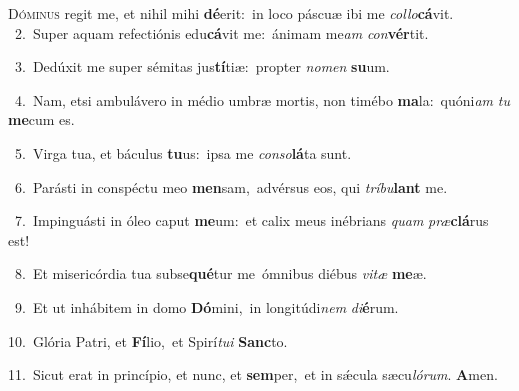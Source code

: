 \lettrine{\initial\textcolor{\initialcolor}{D}}{óminus} regit me, et nihil mihi \textbf{dé}\-erit:~\star in loco páscuæ ibi me \textit{col}\-\textit{lo}\textbf{cá}vit.\\
{\numbfont\textcolor{\numbcolor}{~2.}}~Super aquam refectiónis edu\-\textbf{cá}\-vit me:~\star ánimam me\textit{am} \textit{con}\-\textbf{vér}tit.\par
{\numbfont\textcolor{\numbcolor}{~3.}}~Dedúxit me super sémitas jus\-\textbf{tí}\-tiæ:~\star propter \textit{no}\-\textit{men} \textbf{su}\-um.\par
{\numbfont\textcolor{\numbcolor}{~4.}}~Nam, etsi ambulávero in médio umbræ mortis, non timébo \textbf{ma}\-la:~\star quóni\textit{am} \textit{tu} \textbf{me}\-cum es.\par
{\numbfont\textcolor{\numbcolor}{~5.}}~Virga tua, et báculus \textbf{tu}\-us:~\star ipsa me \textit{con}\-\textit{so}\textbf{lá}ta sunt.\par
{\numbfont\textcolor{\numbcolor}{~6.}}~Parásti in conspéctu meo \textbf{men}\-sam,~\star advérsus eos, qui \textit{trí}\-\textit{bu}\textbf{lant} me.\par
{\numbfont\textcolor{\numbcolor}{~7.}}~Impinguásti in óleo caput \textbf{me}\-um:~\star et calix meus inébrians \textit{quam} \textit{præ}\-\textbf{clá}rus est!\par
{\numbfont\textcolor{\numbcolor}{~8.}}~Et misericórdia tua subse\-\textbf{qué}\-tur me~\star ómnibus diébus \textit{vi}\-\textit{tæ} \textbf{me}\-æ.\par
{\numbfont\textcolor{\numbcolor}{~9.}}~Et ut inhábitem in domo \textbf{Dó}\-mini,~\star in longitúdi\textit{nem} \textit{di}\-\textbf{é}rum.\par
{\numbfont\textcolor{\numbcolor}{10.}}~Glória Patri, et \textbf{Fí}\-lio,~\star et Spirí\-\textit{tu}\-\textit{i} \textbf{Sanc}\-to.\par
{\numbfont\textcolor{\numbcolor}{11.}}~Sicut erat in princípio, et nunc, et \textbf{sem}\-per,~\star et in sǽcula sæcu\-\textit{ló}\-\textit{rum}. \textbf{A}\-men.\par
